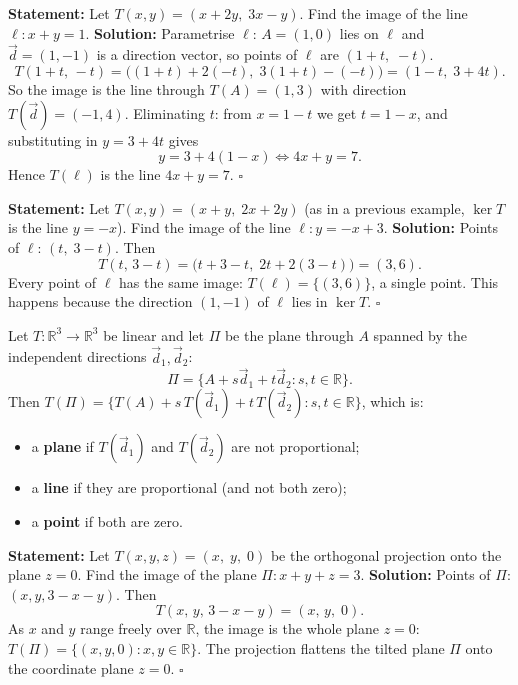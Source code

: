 \documentclass[11pt]{article}
\newcounter{popsec}
\newcounter{popsub}
\newcommand{\courssub}[1]{%
  \stepcounter{popsub}%
  \par\vspace{9pt}\noindent{\popxbold\fontsize{11.5}{13}\selectfont\color{popink}{\color{poporange}\thepopsec.\thepopsub}\hspace{6pt}#1}\par\nopagebreak\vspace{4pt}
}
\begin{document}
\begin{exoresolu}
\noindent\textbf{Statement:} Let $T(x,y) = (x+2y,\; 3x-y)$. Find the image of the line $\ell : x + y = 1$.
\tcblower
\noindent\textbf{Solution:}
Parametrise $\ell$: $A = (1,0)$ lies on $\ell$ and $\vec{d} = (1,-1)$ is a direction vector, so points of $\ell$ are $(1+t,\; -t)$.
\[
T(1+t,\, -t) = \bigl((1+t) + 2(-t),\; 3(1+t) - (-t)\bigr) = (1 - t,\; 3 + 4t).
\]
So the image is the line through $T(A) = (1,3)$ with direction $T(\vec{d}) = (-1, 4)$. Eliminating $t$: from $x = 1-t$ we get $t = 1-x$, and substituting in $y = 3+4t$ gives
\[
y = 3 + 4(1-x) \iff 4x + y = 7.
\]
Hence $T(\ell)$ is the line $4x + y = 7$. \hfill$\square$
\end{exoresolu}

\begin{exoresolu}
\noindent\textbf{Statement:} Let $T(x,y) = (x+y,\; 2x+2y)$ (as in a previous example, $\ker T$ is the line $y=-x$). Find the image of the line $\ell : y = -x + 3$.
\tcblower
\noindent\textbf{Solution:}
Points of $\ell$: $(t,\; 3-t)$. Then
\[
T(t,\, 3-t) = \bigl(t + 3 - t,\; 2t + 2(3-t)\bigr) = (3, 6).
\]
Every point of $\ell$ has the same image: $T(\ell) = \{(3,6)\}$, a single point. This happens because the direction $(1,-1)$ of $\ell$ lies in $\ker T$. \hfill$\square$
\end{exoresolu}

\courssub{Image of a Plane in $\mathbb{R}^3$}

\begin{propriete}
Let $T : \mathbb{R}^3 \to \mathbb{R}^3$ be linear and let $\Pi$ be the plane through $A$ spanned by the independent directions $\vec{d}_1, \vec{d}_2$:
\[
\Pi = \{A + s\vec{d}_1 + t\vec{d}_2 : s,t\in\mathbb{R}\}.
\]
Then $T(\Pi) = \{T(A) + s\,T(\vec{d}_1) + t\,T(\vec{d}_2) : s,t\in\mathbb{R}\}$, which is:
\begin{itemize}
    \item a \textbf{plane} if $T(\vec{d}_1)$ and $T(\vec{d}_2)$ are not proportional;
    \item a \textbf{line} if they are proportional (and not both zero);
    \item a \textbf{point} if both are zero.
\end{itemize}
\end{propriete}

\begin{exoresolu}
\noindent\textbf{Statement:} Let $T(x,y,z) = (x,\; y,\; 0)$ be the orthogonal projection onto the plane $z=0$. Find the image of the plane $\Pi : x + y + z = 3$.
\tcblower
\noindent\textbf{Solution:}
Points of $\Pi$: $(x, y, 3-x-y)$. Then
\[
T(x,\, y,\, 3-x-y) = (x,\, y,\; 0).
\]
As $x$ and $y$ range freely over $\mathbb{R}$, the image is the whole plane $z=0$: $T(\Pi) = \{(x,y,0) : x,y\in\mathbb{R}\}$. The projection flattens the tilted plane $\Pi$ onto the coordinate plane $z=0$. \hfill$\square$
\end{exoresolu}
\end{document}
